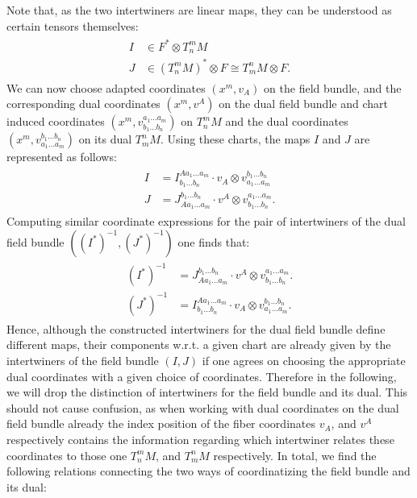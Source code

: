 Note that, as the two intertwiners are linear maps, they can be understood as certain tensors themselves: 
\begin{align}
\begin{aligned}
I &\in F^{\ast} \otimes T^m_n M\\
J &\in (T^m_nM)^{\ast} \otimes F \cong T^n_m M \otimes F.
\end{aligned}
\end{align}
We can now choose adapted coordinates $(x^m,v_A)$ on the field bundle, and the corresponding dual coordinates $(x^m, v^A)$ on the dual field bundle and chart induced coordinates $(x^m, v^{a_1 ... a_m}_{b_1 ... b_n})$ on $T^m_n M$ and the dual coordinates $(x^m, v^{b_1 ... b_n}_{a_1 ... a_m})$ on its dual $T^n_mM$. Using these charts, the maps $I$ and $J$ are represented as follows:
\begin{align} \label{interAbs}
    \begin{aligned}
    I &= I^{A a_1 ... a_m}_{b_1 ... b_n} \cdot v_A \otimes  v^{b_1 ... b_n}_{a_1 ... a_m}\\
    J &= J^{b_1 ... b_n}_{A a_1 ... a_m} \cdot v^A \otimes  v^{a_1 ... a_m}_{b_1 ... b_n}.
    \end{aligned}
\end{align}
Computing similar coordinate expressions for the pair of intertwiners of the dual field bundle $((I^{\ast})^{-1}, (J^{\ast})^{-1})$ one finds that:
\begin{align} \label{dualInterAbs}
    \begin{aligned}
         (I^{\ast})^{-1} &= J^{b_1 ... b_n}_{A a_1 ... a_m} \cdot v^A \otimes  v^{a_1 ... a_m}_{b_1 ... b_n}.\\
         (J^{\ast})^{-1} &= I^{A a_1 ... a_m}_{b_1 ... b_n} \cdot v_A \otimes  v^{b_1 ... b_n}_{a_1 ... a_m}.
    \end{aligned}
\end{align} 
Hence, although the constructed intertwiners for the dual field bundle define different maps, their components w.r.t. a given chart are already given by the intertwiners of the field bundle $(I,J)$ if one agrees on choosing the appropriate dual coordinates with a given choice of coordinates. Therefore in the following, we will drop the distinction of intertwiners for the field bundle and its dual.  This should not cause confusion, as when working with dual coordinates on the dual field bundle already the index position of the fiber coordinates $v_A$, and $v^{A}$ respectively contains the information regarding which intertwiner relates these coordinates to those one $T^m_n M$, and $T^n_mM$ respectively. In total, we find the following relations connecting the two ways of coordinatizing the field bundle and its dual: 
